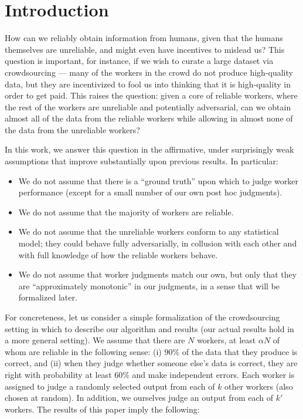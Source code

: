 \section{Introduction}
\label{sec:intro}


How can we reliably obtain information from humans, given that the humans 
themselves are unreliable, and might even have incentives to mislead us?
This question is important, for instance, if we wish to curate a large 
dataset via crowdsourcing --- many of the workers in the crowd do not produce 
high-quality data, but they are incentivized to fool us into thinking that 
it is high-quality in order to get paid. This raises the question: given a 
core of reliable workers, where the rest of the workers are unreliable and 
potentially adversarial, can we obtain almost all of the data from the 
reliable workers while allowing in almost none of the data from the 
unreliable workers?

In this work, we answer this question in the affirmative, under surprisingly 
weak assumptions that improve substantially upon previous results. 
In particular:
\begin{itemize}
\item We do not assume that there is a ``ground truth'' upon which to judge 
      worker performance (except for a small number of our own post hoc judgments).
\item We do not assume that the majority of workers are reliable.
\item We do not assume that the unreliable workers conform to any statistical 
      model; they could behave fully adversarially, in collusion with each other 
      and with full knowledge of how the reliable workers behave.
\item We do not assume that worker judgments match our own, but only that they are 
      ``approximately monotonic'' in our judgments, in a sense that will be 
      formalized later.
\end{itemize}
For concreteness, let us consider a simple formalization of the crowdsourcing 
setting in which to describe our algorithm and results (our actual results hold 
in a more general setting). We assume that there are $N$ workers, at least 
$\alpha N$ of whom are reliable in the following sense: (i) $90\%$ of the data 
that they produce is correct, and (ii) when they judge whether someone else's data 
is correct, they are right with probability at least $60\%$ and make independent 
errors. Each worker is assigned to judge a randomly selected output from each 
of $k$ other workers (also chosen at random). In addition, we ourselves judge 
an output from each of $k'$ workers. The results of this paper imply the 
following:

